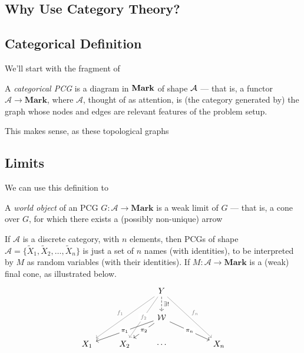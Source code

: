 \documentclass{article}
\begin{document}
\begin{vcat}
	\subsection{Why Use Category Theory?}\label{sec:cat-defense}
	

	\subsection{Categorical Definition}\label{sec:cat-defs}
	We'll start with the fragment of 
	
	\begin{defn}
		A \emph{categorical PCG} is a diagram in $\bf Mark$ of shape $\cal A$ --- that is, a functor $\mathcal A \to \mathbf{Mark}$, where $\mathcal A$, thought of as attention, is (the category generated by) the graph whose nodes and edges are relevant features of the problem setup.
	\end{defn}
	
	This makes sense, as these topological graphs
	\subsection{Limits } \label{sec:cat-worlds}
	
	We can use this definition to 
	
	\begin{defn}
		A \emph{world object} of an PCG $G : \mathcal A \to \mathbf{Mark}$ is a weak limit of $G$ --- that is, a cone over $G$, for which there exists a (possibly non-unique) arrow 
	\end{defn}

	\begin{example}
		If $\mathcal A$ is a discrete category, with $n$ elements, then PCGs of shape $\mathcal A = \{\tilde X_1, \tilde X_2, \ldots, \tilde X_n\}$ is just a set of $n$ names (with identities), to be interpreted by $M$ as random variables (with their identities). If $M : \mathcal A \to \mathbf{Mark}$ is a (weak) final cone, as illustrated below.
		\[ \begin{tikzcd}
				&& Y  \ar[ddll, gray, "f_1"']\ar[ddl,gray, "f_2"description]\ar[ddrr,gray, "f_n"] \ar[d, dashed, "\exists!"]\\
				&& \mathcal W \ar[dll, "\pi_1"description]\ar[dl, "\pi_2"description]\ar[drr, "\pi_n"description] \\
				X_1 & X_2 & \cdots & & X_n
			\end{tikzcd} \]
			

\end{example}
\end{vcat}
\end{document}
